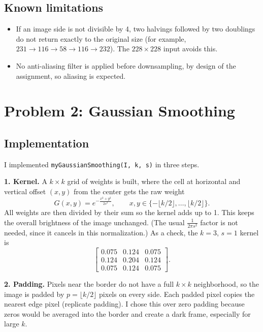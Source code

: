 \documentclass[11pt]{article}
\begin{document}
\subsection*{Known limitations}
\begin{itemize}
  \item If an image side is not divisible by 4, two halvings followed by two
        doublings do not return exactly to the original size (for example,
        $231 \rightarrow 116 \rightarrow 58 \rightarrow 116 \rightarrow 232$).
        The $228 \times 228$ input avoids this.
  \item No anti-aliasing filter is applied before downsampling, by design of
        the assignment, so aliasing is expected.
\end{itemize}

\section*{Problem 2: Gaussian Smoothing}

\subsection*{Implementation}
I implemented \texttt{myGaussianSmoothing(I, k, s)} in three steps.

\textbf{1. Kernel.} A $k \times k$ grid of weights is built, where the cell at
horizontal and vertical offset $(x, y)$ from the center gets the raw weight
\[
  G(x, y) = e^{-\frac{x^2 + y^2}{2s^2}}, \qquad x, y \in \{-\lfloor k/2 \rfloor, \dots, \lfloor k/2 \rfloor\}.
\]
All weights are then divided by their sum so the kernel adds up to 1. This
keeps the overall brightness of the image unchanged. (The usual
$\frac{1}{2\pi s^2}$ factor is not needed, since it cancels in this
normalization.) As a check, the $k=3$, $s=1$ kernel is
\[
\begin{bmatrix}
0.075 & 0.124 & 0.075\\
0.124 & 0.204 & 0.124\\
0.075 & 0.124 & 0.075
\end{bmatrix}.
\]

\textbf{2. Padding.} Pixels near the border do not have a full $k \times k$
neighborhood, so the image is padded by $p = \lfloor k/2 \rfloor$ pixels on
every side. Each padded pixel copies the nearest edge pixel (replicate
padding). I chose this over zero padding because zeros would be averaged into
the border and create a dark frame, especially for large $k$.
\end{document}
